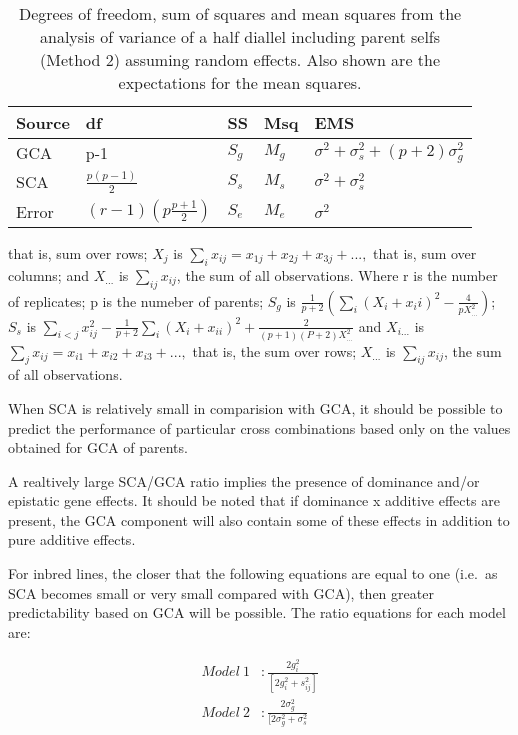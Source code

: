 \documentclass[nofonts,]{tufte-handout}
\begin{document}
\begin{table}[t]

\caption{\label{tab:half-diallel-random}Degrees of freedom, sum of squares and mean squares from the analysis of variance of a half diallel including parent selfs (Method 2) assuming random effects. Also shown are the expectations for the mean squares.}
\centering
\begin{tabular}{lllll}
\toprule
Source & df & SS & Msq & EMS\\
\midrule
GCA & p-1 & $S_g$ & $M_g$ & $\sigma^2 + \sigma^2_s + (p+2)\sigma^2_g$\\
SCA & $\frac{p(p-1)}{2}$ & $S_s$ & $M_s$ & $\sigma^2 + \sigma_s^2$\\
Error & $(r-1)\left(p\frac{p+1}{2}\right)$ & $S_e$ & $M_e$ & $\sigma^2$\\
\bottomrule
\end{tabular}
\end{table}

that is, sum over rows; \(X_j\) is
\(\sum_ix_{ij} = x_{1j} + x_{2j} + x_{3j} + ...,\) that is, sum over
columns; and \(X_{...}\) is \(\sum_{ij}x_{ij}\), the sum of all
observations. Where r is the number of replicates; p is the numeber of
parents; \(S_g\) is
\(\frac{1}{p+2}(\sum_i(X_i + x_ii)^2-\frac{4}{pX_{...}^2})\); \(S_s\) is
\(\sum_{i<j}x_{ij}^2-\frac{1}{p+2}\sum_i(X_i + x_{ii})^2 + \frac{2}{(p+1)(P+2)X_{...}^2}\)
and \(X_{i...}\) is \(\sum_j x_{ij} = x_{i1} + x_{i2} + x_{i3} + ...,\)
that is, the sum over rows; \(X_{...}\) is \(\sum_{ij}x_{ij}\), the sum
of all observations.

When SCA is relatively small in comparision with GCA, it should be
possible to predict the performance of particular cross combinations
based only on the values obtained for GCA of parents.

A realtively large SCA/GCA ratio implies the presence of dominance
and/or epistatic gene effects. It should be noted that if dominance x
additive effects are present, the GCA component will also contain some
of these effects in addition to pure additive effects.

For inbred lines, the closer that the following equations are equal to
one (i.e.~as SCA becomes small or very small compared with GCA), then
greater predictability based on GCA will be possible. The ratio
equations for each model are:

\[
\begin{aligned}
Model~1 &: \frac{2g_i^2}{[2g_i^2 + s_{ij}^2]} \\
Model~2 &: \frac{2\sigma_g^2}{[2\sigma_g^2 + \sigma_s^2}
\end{aligned}
\]
\end{document}

